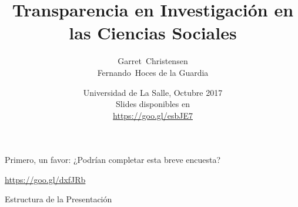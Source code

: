 \documentclass{beamer}
\title[Transparencia en Investigación en las Ciencias Sociales] %
{Transparencia en Investigación en las Ciencias Sociales}
\subtitle
{}
\author[] %
{Garret~Christensen\inst{1}\inst{2}\\
Fernando~Hoces de la Guardia\inst{1}}
\institute[Universities of Somewhere and Elsewhere] %
{
  \inst{1}%
  UC Berkeley:\\
  Berkeley Initiative for Transparency in the Social Sciences\\
  \inst{2}%
  Berkeley Institute for Data Sciences\\
}
\date[BITSS2017] %
{Universidad de La Salle, Octubre 2017\\
Slides disponibles en \\ \url{https://goo.gl/esbJE7}}
\begin{document}
\begin{frame}
  \titlepage
\end{frame}






\begin{frame}
Primero, un favor: ¿Podrían completar esta breve encuesta?

\huge{\url{https://goo.gl/dxfJRb}}


\end{frame}

\begin{frame}{Estructura de la Presentación}
  \tableofcontents
\end{frame}
\end{document}
